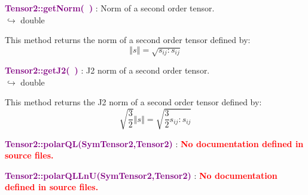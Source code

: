 \textcolor{purple}{\textbf{Tensor2::getNorm(~)}}\label{Tensor2::getNorm()} : Norm of a second order tensor.\\ \hspace*{5mm}$\hookrightarrow$ double

This method returns the norm of a second order tensor defined by:\begin{equation*}
\left\Vert s \right\Vert  = \sqrt {s_{ij}:s_{ij}}
\end{equation*}

\textcolor{purple}{\textbf{Tensor2::getJ2(~)}}\label{Tensor2::getJ2()} : J2 norm of a second order tensor.\\ \hspace*{5mm}$\hookrightarrow$ double

This method returns the J2 norm of a second order tensor defined by:
\begin{equation*}
\sqrt {\frac{3}{2}} \left\Vert s \right\Vert  = \sqrt {\frac{3}{2} s_{ij}:s_{ij}}
\end{equation*}

\textcolor{purple}{\textbf{Tensor2::polarQL(SymTensor2,Tensor2)}}\label{Tensor2::polarQL(SymTensor2,Tensor2)} : \textcolor{red}{\textbf{No documentation defined in source files.}}


\textcolor{purple}{\textbf{Tensor2::polarQLLnU(SymTensor2,Tensor2)}}\label{Tensor2::polarQLLnU(SymTensor2,Tensor2)} : \textcolor{red}{\textbf{No documentation defined in source files.}}

